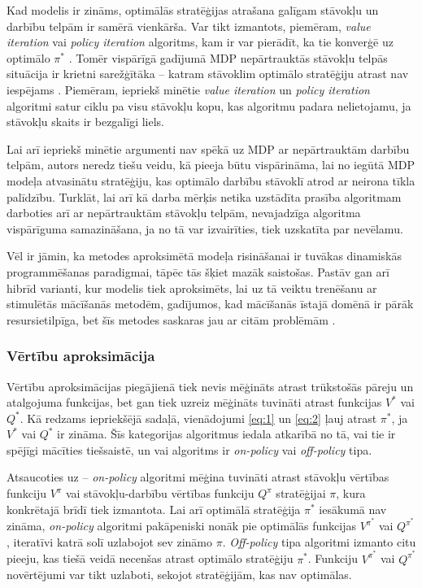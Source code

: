 \documentclass{ludis} %
\begin{document}
Kad modelis ir zināms, optimālās stratēģijas atrašana galīgam stāvokļu un
darbību telpām ir samērā vienkārša. Var tikt izmantots, piemēram, \textit{value
  iteration} vai \textit{policy iteration} algoritms, kam ir var pierādīt, ka
tie konverģē uz optimālo $\pi^*$ \autocite{Barto}. Tomēr vispārīgā gadījumā MDP
nepārtrauktās stāvokļu telpās situācija ir krietni sarežģītāka -- katram
stāvoklim optimālo stratēģiju atrast nav iespējams \autocite{Otterlo}. Piemēram,
iepriekš minētie \textit{value iteration} un \textit{policy iteration} algoritmi
satur ciklu pa visu stāvokļu kopu, kas algoritmu padara nelietojamu, ja stāvokļu
skaits ir bezgalīgi liels.


Lai arī iepriekš minētie argumenti nav spēkā uz MDP ar nepārtrauktām darbību
telpām, autors neredz tiešu veidu, kā pieeja būtu vispārināma, lai no iegūtā MDP
modeļa atvasinātu stratēģiju, kas optimālo darbību stāvoklī atrod ar neirona
tīkla palīdzību.
Turklāt, lai arī kā darba mērķis netika uzstādīta prasība algoritmam darboties
arī ar nepārtrauktām stāvokļu telpām, nevajadzīga algoritma vispārīguma
samazināšana, ja no tā var izvairīties, tiek uzskatīta par nevēlamu.

Vēl ir jāmin, ka metodes aproksimētā modeļa risināšanai ir tuvākas dinamiskās
programmēšanas paradigmai, tāpēc tās šķiet mazāk saistošas. Pastāv gan arī
hibrīd varianti, kur modelis tiek aproksimēts, lai uz tā veiktu trenēšanu ar
stimulētās mācīšanās metodēm, gadījumos, kad mācīšanās īstajā domēnā ir pārāk
resursietilpīga, bet šīs metodes saskaras jau ar citām problēmām
\autocite{Hasselt2012}.

\subsubsection{Vērtību aproksimācija}
Vērtību aproksimācijas piegājienā tiek nevis mēģināts atrast trūkstošās pāreju
un atalgojuma funkcijas, bet gan tiek uzreiz mēģināts tuvināti atrast funkcijas
$V^*$ vai $Q^*$. Kā redzams iepriekšējā sadaļā, vienādojumi \eqref{eq:1} un
\eqref{eq:2} ļauj atrast $\pi^*$, ja $V^*$ vai $Q^*$ ir zināma. Šīs kategorijas
algoritmus iedala atkarībā no tā, vai tie ir spējīgi mācīties tiešsaistē, un vai
algoritms ir \textit{on-policy} vai \textit{off-policy} tipa.

Atsaucoties uz \autocite{Hasselt2012} -- \textit{on-policy} algoritmi mēģina
tuvināti atrast stāvokļu vērtības funkciju $V^\pi$ vai stāvokļu-darbību vērtības
funkciju $Q^\pi$ stratēģijai $\pi$, kura konkrētajā brīdī tiek izmantota. Lai
arī optimālā stratēģija $\pi^*$ iesākumā nav zināma, \textit{on-policy}
algoritmi pakāpeniski nonāk pie optimālās funkcijas $V^{\pi^*}$ vai $Q^{\pi^*}$,
iteratīvi katrā solī uzlabojot sev zināmo $\pi$. \textit{Off-policy} tipa
algoritmi izmanto citu pieeju, kas tiešā veidā necenšas atrast optimālo
stratēģiju $\pi^*$. Funkciju $V^{\pi^*}$ vai $Q^{\pi^*}$ novērtējumi var tikt
uzlaboti, sekojot stratēģijām, kas nav optimālas.
\end{document}

